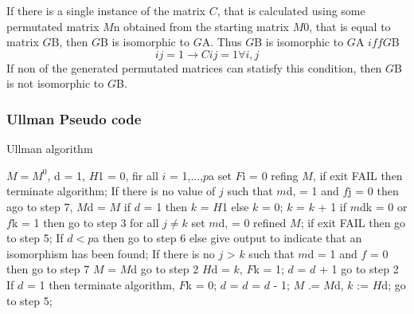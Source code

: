If there is a single instance of the matrix $C$, that is calculated using some permutated matrix $M${\tiny n} obtained from the starting matrix $M0$, that is equal to matrix $G${\tiny B}, then $G${\tiny B} is isomorphic to $G${\tiny A}. Thus $G${\tiny B} is isomorphic to $G${\tiny A} $iff G${\tiny B}
  \begin{equation}	
	ij = 1 \rightarrow  Cij = 1 \forall i,j
  \end{equation} 
If non of the generated permutated matrices can statisfy this condition, then $G${\tiny B} is not isomorphic to $G${\tiny B}.

\subsubsection{Ullman Pseudo code}	
	\begin{algorithm}[H]
	    \caption{Ullman algorithm}
	    \begin{algorithmic}[1]
	      \State $M = M^0$, d = 1, $H${\tiny 1} = 0, \newline
		      fir all $i$ = 1,...,$p${\tiny a} set $F${\tiny i} = 0 \newline
		      refing $M$, if exit FAIL then terminate algorithm;\newline
	      \State If there is no value of $j$ such that $m${\tiny d}, = 1 and $f${\tiny j} = 0 then ago to step 7,\newline
		      $M${\tiny d} = $M$\newline
		      if $d$ = 1 then $k$ = $H${\tiny 1} else $k$ = 0;\newline
	      \State $k$ = $k$ + 1\newline
		      if $m${\tiny dk} = 0 or $f${\tiny k} = 1 then go to step 3\newline
		      for all $j \neq k$ set $m${\tiny d}, = 0\newline
		      refined $M$; if exit FAIL then go to step 5;\newline
	      \State If $d < p${\tiny a} then go to step 6 else give output to indicate that an isomorphism has been found;\newline
	      \State If there is no $j$ > $k$ such that $m${\tiny d} = 1 and $f$ = 0 then go to step 7\newline
		      $M$ = $M${\tiny d}\newline
		      go to step 2\newline
	      \State $H${\tiny d} = $k$, $F${\tiny k} = 1; $d$ = $d$ + 1\newline
		      go to step 2\newline
	      \State If $d$ = 1 then terminate algorithm,\newline
		      $F${\tiny k} = 0; $d$ = $d$ = $d$ - 1; $M$ .= $M${\tiny d}, $k$ := $H${\tiny d};\newline
		      go to step 5;\newline
	    \end{algorithmic}
	\end{algorithm}
\newpage

